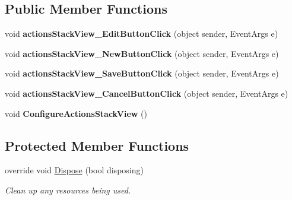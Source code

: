 \subsection*{Public Member Functions}
\begin{DoxyCompactItemize}
\item 
\mbox{\label{class_h_k_supply_1_1_forms_1_1_master_1_1_functionality_role_management_ad8f36ecae11021e4d8d2f5b06de7b881}} 
void {\bfseries actions\+Stack\+View\+\_\+\+Edit\+Button\+Click} (object sender, Event\+Args e)
\item 
\mbox{\label{class_h_k_supply_1_1_forms_1_1_master_1_1_functionality_role_management_a3bed94c9724e4256dd85fcc8d4c2f276}} 
void {\bfseries actions\+Stack\+View\+\_\+\+New\+Button\+Click} (object sender, Event\+Args e)
\item 
\mbox{\label{class_h_k_supply_1_1_forms_1_1_master_1_1_functionality_role_management_a8aed80ca8eb88d632fa3501141f4399d}} 
void {\bfseries actions\+Stack\+View\+\_\+\+Save\+Button\+Click} (object sender, Event\+Args e)
\item 
\mbox{\label{class_h_k_supply_1_1_forms_1_1_master_1_1_functionality_role_management_a00fc25391f0a3d782823871e2d897b4b}} 
void {\bfseries actions\+Stack\+View\+\_\+\+Cancel\+Button\+Click} (object sender, Event\+Args e)
\item 
\mbox{\label{class_h_k_supply_1_1_forms_1_1_master_1_1_functionality_role_management_adcf6dece3abda929fb54cec2bec5a708}} 
void {\bfseries Configure\+Actions\+Stack\+View} ()
\end{DoxyCompactItemize}
\subsection*{Protected Member Functions}
\begin{DoxyCompactItemize}
\item 
override void \hyperlink{class_h_k_supply_1_1_forms_1_1_master_1_1_functionality_role_management_a9a7c00e015e462fba8baf1e25be79413}{Dispose} (bool disposing)
\begin{DoxyCompactList}\small\item\em Clean up any resources being used. \end{DoxyCompactList}\end{DoxyCompactItemize}


